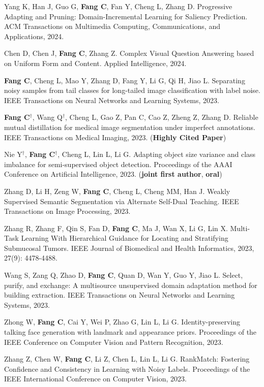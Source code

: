 \documentclass[a4paper,36pt]{article}
\newcommand{\tb}[1]{\textbf{#1}}
\newcommand{\resumeItemWithoutTitle}[1]{
  \item\justifying\small{
    {#1 \vspace{-2pt}}
  }
}
\begin{document}
\resumeItemWithoutTitle{Yang K, Han J, Guo G, \tb{Fang C}, Fan Y, Cheng L, Zhang D. Progressive Adapting and Pruning: Domain-Incremental Learning for Saliency Prediction. ACM Transactions on Multimedia Computing, Communications, and Applications, 2024.}

\resumeItemWithoutTitle{Chen D, Chen J, \tb{Fang C}, Zhang Z. Complex Visual Question Answering based on Uniform Form and Content. Applied Intelligence, 2024.}
\resumeItemWithoutTitle{\tb{Fang C}, Cheng L, Mao Y, Zhang D, Fang Y, Li G, Qi H, Jiao L. Separating noisy samples from tail classes for long-tailed image classification with label noise. IEEE Transactions on Neural Networks and Learning Systems, 2023.}

\resumeItemWithoutTitle{\tb{Fang C}$^\dag$, Wang Q$^\dag$, Cheng L, Gao Z, Pan C, Cao Z, Zheng Z, Zhang D. Reliable mutual distillation for medical image segmentation under imperfect annotations. IEEE Transactions on Medical Imaging, 2023. (\tb{Highly Cited Paper})}

\resumeItemWithoutTitle{Nie Y$^{\dag}$, \tb{Fang C}$^{\dag}$, Cheng L, Lin L, Li G. Adapting object size variance and class imbalance for semi-supervised object detection. Proceedings of the AAAI Conference on Artificial Intelligence, 2023. (\tb{joint first author}, \tb{oral})}
\resumeItemWithoutTitle{Zhang D, Li H, Zeng W, \tb{Fang C}, Cheng L, Cheng MM, Han J. Weakly Supervised Semantic Segmentation via Alternate Self-Dual Teaching. IEEE Transactions on Image Processing, 2023.}

\resumeItemWithoutTitle{Zhang R, Zhang F, Qin S, Fan D, \tb{Fang C}, Ma J, Wan X, Li G, Lin X. Multi-Task Learning With Hierarchical Guidance for Locating and Stratifying Submucosal Tumors. IEEE Journal of Biomedical and Health Informatics, 2023, 27(9): 4478-4488.}

\resumeItemWithoutTitle{Wang S, Zang Q, Zhao D, \tb{Fang C}, Quan D, Wan Y, Guo Y, Jiao L. Select, purify, and exchange: A multisource unsupervised domain adaptation method for building extraction. IEEE Transactions on Neural Networks and Learning Systems, 2023.}

\resumeItemWithoutTitle{Zhong W, \tb{Fang C}, Cai Y, Wei P, Zhao G, Lin L, Li G. Identity-preserving talking face generation with landmark and appearance priors. Proceedings of the IEEE Conference on Computer Vision and Pattern Recognition, 2023. }

\resumeItemWithoutTitle{Zhang Z, Chen W, \tb{Fang C}, Li Z, Chen L, Lin L, Li G. RankMatch: Fostering Confidence and Consistency in Learning with Noisy Labels. Proceedings of the IEEE International Conference on Computer Vision, 2023. }
\end{document}
